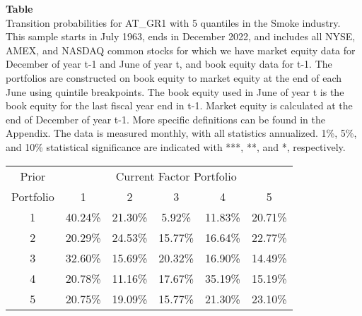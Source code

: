 \begin{table*}[ht!]
\raggedright
{}
\label{tab: transition_probs_AT_GR1_Smoke_with_5_quantiles}
\textbf{Table \thetable} \\
Transition probabilities for AT_GR1 with 5 quantiles in the Smoke industry. \\
\hspace*{1em}This sample starts in July 1963, ends in December 2022, and includes all NYSE, AMEX, and NASDAQ common stocks for which we have market equity data for December of year t-1 and June of year t, and book equity data for t-1. The portfolios are constructed on book equity to market equity at the end of each June using quintile breakpoints.  The book equity used in June of year t is the book equity for the last fiscal year end in t-1.  Market equity is calculated at the end of December of year t-1.  More specific definitions can be found in the Appendix.  The data is measured monthly, with all statistics annualized.  1\%, 5\%, and 10\% statistical significance are indicated with ***, **, and *, respectively. \\
\vspace{0.5em}
\centering
\begin{adjustbox}{max width=\textwidth}
\begin{tabular}{@{}cccccc@{}}
\toprule
Prior & \multicolumn{5}{c}{Current Factor Portfolio} \\
Portfolio & 1 & 2 & 3 & 4 & 5 \\
\midrule
1 & 40.24\% & 21.30\% & 5.92\% & 11.83\% & 20.71\% \\
2 & 20.29\% & 24.53\% & 15.77\% & 16.64\% & 22.77\% \\
3 & 32.60\% & 15.69\% & 20.32\% & 16.90\% & 14.49\% \\
4 & 20.78\% & 11.16\% & 17.67\% & 35.19\% & 15.19\% \\
5 & 20.75\% & 19.09\% & 15.77\% & 21.30\% & 23.10\% \\
\bottomrule
\end{tabular}
\end{adjustbox}
\end{table*}